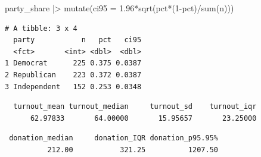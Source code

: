 \documentclass[
  letterpaper,
  DIV=11,
  numbers=noendperiod]{scrreprt}
\newenvironment{Shaded}{\begin{snugshade}}{\end{snugshade}}
\newcommand{\AttributeTok}[1]{\textcolor[rgb]{0.40,0.45,0.13}{#1}}
\newcommand{\DecValTok}[1]{\textcolor[rgb]{0.68,0.00,0.00}{#1}}
\newcommand{\FloatTok}[1]{\textcolor[rgb]{0.68,0.00,0.00}{#1}}
\newcommand{\FunctionTok}[1]{\textcolor[rgb]{0.28,0.35,0.67}{#1}}
\newcommand{\NormalTok}[1]{\textcolor[rgb]{0.00,0.23,0.31}{#1}}
\newcommand{\SpecialCharTok}[1]{\textcolor[rgb]{0.37,0.37,0.37}{#1}}
\begin{document}
\begin{Shaded}
\begin{Highlighting}[]
\NormalTok{party\_share }\SpecialCharTok{|\textgreater{}} \FunctionTok{mutate}\NormalTok{(}\AttributeTok{ci95 =} \FloatTok{1.96}\SpecialCharTok{*}\FunctionTok{sqrt}\NormalTok{(pct}\SpecialCharTok{*}\NormalTok{(}\DecValTok{1}\SpecialCharTok{{-}}\NormalTok{pct)}\SpecialCharTok{/}\FunctionTok{sum}\NormalTok{(n)))}
\end{Highlighting}
\end{Shaded}

\begin{verbatim}
# A tibble: 3 x 4
  party           n   pct   ci95
  <fct>       <int> <dbl>  <dbl>
1 Democrat      225 0.375 0.0387
2 Republican    223 0.372 0.0387
3 Independent   152 0.253 0.0348
\end{verbatim}

\begin{Shaded}
\end{Shaded}

\begin{verbatim}
  turnout_mean turnout_median     turnout_sd    turnout_iqr 
      62.97833       64.00000       15.95657       23.25000 
\end{verbatim}

\begin{Shaded}
\end{Shaded}

\begin{verbatim}
 donation_median     donation_IQR donation_p95.95% 
          212.00           321.25          1207.50 
\end{verbatim}
\end{document}
